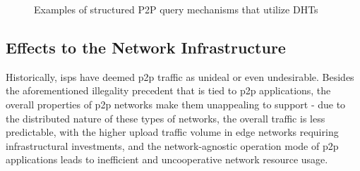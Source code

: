 \begin{figure}[h]
\centering
{}
\qquad
{}%
\caption{Examples of structured P2P query mechanisms that utilize DHTs}
\label{fig:dht-usage}
\end{figure}

\subsection{Effects to the Network Infrastructure}

\label{ssec:p2p-effects}

    Historically, \glspl{isp} have deemed \gls{p2p} traffic as unideal or even undesirable.
    Besides the aforementioned illegality precedent that is tied to \gls{p2p} applications, the overall properties of \gls{p2p} networks make them unappealing to support - due to the distributed nature of these types of networks, the overall traffic is less predictable, with the higher upload traffic volume in edge networks requiring infrastructural investments, and the network-agnostic operation mode of \gls{p2p} applications leads to inefficient and uncooperative network resource usage.

